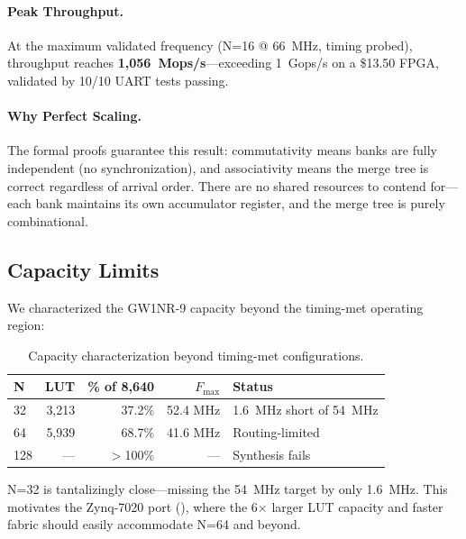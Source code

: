 \documentclass[11pt,letterpaper]{article}
\theoremstyle{plain}
\theoremstyle{definition}
\theoremstyle{remark}
\begin{document}
\paragraph{Peak Throughput.} At the maximum validated frequency (N=16 @ 66~MHz, timing probed), throughput reaches \textbf{1,056~Mops/s}---exceeding 1~Gops/s on a \$13.50 FPGA, validated by 10/10 UART tests passing.

\paragraph{Why Perfect Scaling.} The formal proofs guarantee this result: commutativity means banks are fully independent (no synchronization), and associativity means the merge tree is correct regardless of arrival order. There are no shared resources to contend for---each bank maintains its own accumulator register, and the merge tree is purely combinational.

\subsection{Capacity Limits}

We characterized the GW1NR-9 capacity beyond the timing-met operating region:

\begin{table}[!htbp]
\centering
\caption{Capacity characterization beyond timing-met configurations.}
\label{tab:capacity}
\begin{tabular}{@{}lrrrl@{}}
\toprule
\textbf{N} & \textbf{LUT} & \textbf{\% of 8,640} & \textbf{$F_{\max}$} & \textbf{Status} \\
\midrule
32  & 3,213 & 37.2\% & 52.4 MHz & 1.6~MHz short of 54~MHz \\
64  & 5,939 & 68.7\% & 41.6 MHz & Routing-limited \\
128 & ---   & $>$100\% & ---  & Synthesis fails \\
\bottomrule
\end{tabular}
\end{table}

N=32 is tantalizingly close---missing the 54~MHz target by only 1.6~MHz. This motivates the Zynq-7020 port (), where the 6$\times$ larger LUT capacity and faster fabric should easily accommodate N=64 and beyond.

\end{document}
